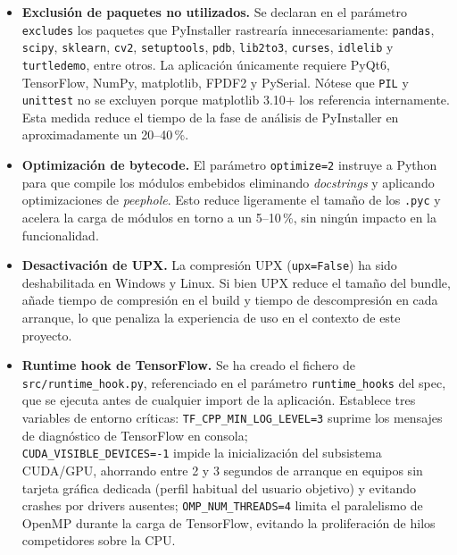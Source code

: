 \begin{itemize}
    \item \textbf{Exclusión de paquetes no utilizados.} Se declaran en el
    parámetro \texttt{excludes} los paquetes que PyInstaller rastrearía
    innecesariamente: \texttt{pandas}, \texttt{scipy}, \texttt{sklearn},
    \texttt{cv2}, \texttt{setuptools}, \texttt{pdb}, \texttt{lib2to3},
    \texttt{curses}, \texttt{idlelib} y \texttt{turtledemo}, entre otros.
    La aplicación únicamente requiere PyQt6, TensorFlow, NumPy, matplotlib,
    FPDF2 y PySerial. Nótese que \texttt{PIL} y \texttt{unittest} no se
    excluyen porque matplotlib 3.10+ los referencia internamente. Esta
    medida reduce el tiempo de la fase de análisis de PyInstaller en
    aproximadamente un 20--40\,\%.

    \item \textbf{Optimización de bytecode.} El parámetro \texttt{optimize=2}
    instruye a Python para que compile los módulos embebidos eliminando
    \textit{docstrings} y aplicando optimizaciones de \textit{peephole}.
    Esto reduce ligeramente el tamaño de los \texttt{.pyc} y acelera la
    carga de módulos en torno a un 5--10\,\%, sin ningún impacto en la
    funcionalidad.

    \item \textbf{Desactivación de UPX.} La compresión UPX
    (\texttt{upx=False}) ha sido deshabilitada en Windows y Linux. Si bien
    UPX reduce el tamaño del bundle, añade tiempo de compresión en el build
    y tiempo de descompresión en cada arranque, lo que penaliza la experiencia
    de uso en el contexto de este proyecto.

    \item \textbf{Runtime hook de TensorFlow.} Se ha creado el fichero de \\
    \texttt{src/runtime\_hook.py}, referenciado en el parámetro
    \texttt{runtime\_hooks} del spec, que se ejecuta antes de cualquier
    import de la aplicación. Establece tres variables de entorno críticas:
    \texttt{TF\_CPP\_MIN\_LOG\_LEVEL=3} suprime los mensajes de diagnóstico
    de TensorFlow en consola;\\ \texttt{CUDA\_VISIBLE\_DEVICES=-1} impide la
    inicialización del subsistema CUDA/GPU, ahorrando entre 2 y 3 segundos
    de arranque en equipos sin tarjeta gráfica dedicada (perfil habitual del
    usuario objetivo) y evitando crashes por drivers ausentes;
    \texttt{OMP\_NUM\_THREADS=4} limita el paralelismo de OpenMP durante la
    carga de TensorFlow, evitando la proliferación de hilos competidores
    sobre la CPU.
\end{itemize}

